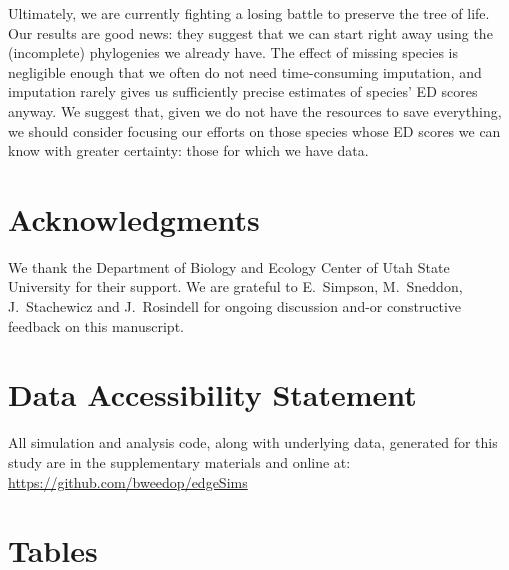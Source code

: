 \documentclass[10pt,english]{article}
\begin{document}
Ultimately, we are currently fighting a losing battle to preserve the tree of
life. Our results are good news: they suggest that we can start right away using
the (incomplete) phylogenies we already have. The effect of missing species is
negligible enough that we often do not need time-consuming imputation, and
imputation rarely gives us sufficiently precise estimates of species' ED scores
anyway. We suggest that, given we do not have the resources to save
everything, we should consider focusing our efforts on those species whose ED
scores we can know with greater certainty: those for which we have data.

\section*{Acknowledgments}
We thank the Department of Biology and Ecology Center of Utah State University
for their support. We are grateful to E.\ Simpson, M.\ Sneddon, J.\
Stachewicz and J.\ Rosindell for ongoing discussion and-or constructive feedback
on this manuscript.

\clearpage
\printbibliography

\section*{Data Accessibility Statement}
All simulation and analysis code, along with underlying data, generated for this
study are in the supplementary materials and online at:
\url{https://github.com/bweedop/edgeSims}

\section*{Tables}
\end{document}
